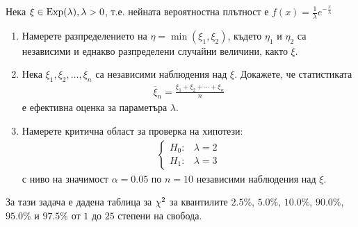 \documentclass[numbers=endperiod, bibliography=totocnumbered]{scrartcl}
\begin{document}
\begin{exercise}\label{ex:se_summer2011}
  Нека \( \xi \in \operatorname{Exp}(\lambda), \lambda > 0 \), т.е. нейната вероятностна плътност е \( f(x) = \frac 1 \lambda e^{-\frac x \lambda} \)
  \begin{enumerate}[label=\alph*)]
    \item Намерете разпределението на \( \eta = \min(\xi_1, \xi_2) \), където \( \eta_1 \) и \( \eta_2 \) са независими и еднакво разпределени случайни величини, както \( \xi \).

    \item Нека \( \xi_1, \xi_2, \ldots, \xi_n \) са независими наблюдения над \( \xi \). Докажете, че статистиката
    \begin{align*}
      \overline \xi_n = \frac {\xi_1 + \xi_2 + \cdots + \xi_n} n
    \end{align*}
    е ефективна оценка за параметъра \( \lambda \).

    \item Намерете критична област за проверка на хипотези:
    \begin{align*}
      \begin{cases}
        H_0: &\lambda = 2 \\
        H_1: &\lambda = 3
      \end{cases}
    \end{align*}
    с ниво на значимост \( \alpha = 0.05 \) по \( n = 10 \) независими наблюдения над \( \xi \).
  \end{enumerate}
\end{exercise}

\begin{note}
  За тази задача е дадена таблица за \( \operatorname{\chi^2} \) за квантилите \( 2.5\% \), \( 5.0\% \), \( 10.0\% \), \( 90.0\% \), \( 95.0\% \) и \( 97.5\% \) от \( 1 \) до \( 25 \) степени на свобода.
\end{note}
\end{document}
